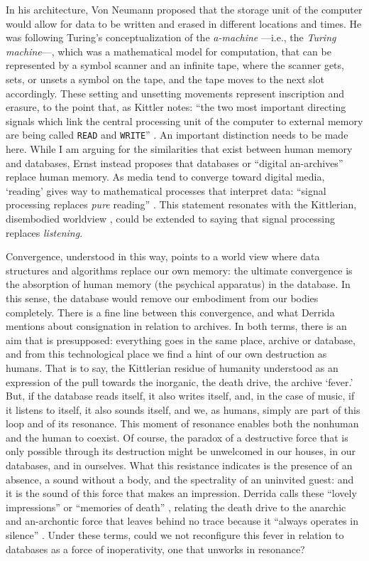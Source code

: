 In his architecture, Von Neumann proposed that the storage unit of the computer would allow for data to be written and erased in different locations and times. He was following Turing's conceptualization of the \textit{a-machine} ---i.e., the \textit{Turing machine}---, which was a mathematical model for computation, that can be represented by a symbol scanner and an infinite tape, where the scanner gets, sets, or unsets a symbol on the tape, and the tape moves to the next slot accordingly. These setting and unsetting movements represent inscription and erasure, to the point that, as Kittler notes: ``the two most important directing signals which link the central processing unit of the computer to external memory are being called \texttt{READ} and \texttt{WRITE}'' \parencite[131]{Ern13:Dig}. An important distinction needs to be made here. While I am arguing for the similarities that exist between human memory and databases, Ernst instead proposes that databases or ``digital an-archives'' replace human memory. As media tend to converge toward digital media, `reading’ gives way to mathematical processes that interpret data: ``signal processing replaces \textit{pure} reading'' \im \parencite[130]{Ern13:Dig}. This statement resonates with the Kittlerian, disembodied worldview , could be extended to saying that signal processing replaces \textit{listening}. 


Convergence, understood in this way, points to a world view where data structures and algorithms replace our own memory: the ultimate convergence is the absorption of human memory (the psychical apparatus) in the database. In this sense, the database would remove our embodiment from our bodies completely. There is a fine line between this convergence, and what Derrida mentions about consignation in relation to archives. In both terms, there is an aim that is presupposed: everything goes in the same place, archive or database, and from this technological place we find a hint of our own destruction as humans. That is to say, the Kittlerian residue of humanity understood as an expression of the pull towards the inorganic, the death drive, the archive `fever.' But, if the database reads itself, it also writes itself, and, in the case of music, if it listens to itself, it also sounds itself, and we, as humans, simply are part of this loop and of its resonance. This moment of resonance enables both the nonhuman and the human to coexist. Of course, the paradox of a destructive force that is only possible through its destruction might be unwelcomed in our houses, in our databases, and in ourselves. What this resistance indicates is the presence of an absence, a sound without a body, and the spectrality of an uninvited guest: and it is the sound of this force that makes an impression. Derrida calls these ``lovely impressions'' or ``memories of death'' \parencite[14]{Der95:Arc}, relating the death drive to the anarchic and an-archontic force that leaves behind no trace because it ``always operates in silence'' \parencite[14]{Der95:Arc}. Under these terms, could we not reconfigure this fever in relation to databases as a force of inoperativity, one that unworks in resonance?


